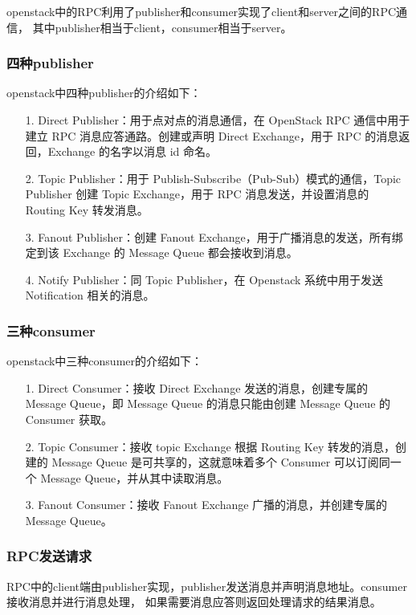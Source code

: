 \documentclass[a4paper,left=1.5cm,right=1.5cm,11pt]{article}
\begin{document}
	openstack中的RPC利用了publisher和consumer实现了client和server之间的RPC通信，
	其中publisher相当于client，consumer相当于server。\par

\subsubsection{四种publisher}
	openstack中四种publisher的介绍如下：
	\begin{itemize}
		\item[1.] Direct Publisher：用于点对点的消息通信，在 OpenStack RPC 通信中用于建立 RPC 消息应答通路。创建或声明 Direct Exchange，用于 RPC 的消息返回，Exchange 的名字以消息 id 命名。
		\item[2.] Topic Publisher：用于 Publish-Subscribe（Pub-Sub）模式的通信，Topic Publisher 创建 Topic Exchange，用于 RPC 消息发送，并设置消息的 Routing Key 转发消息。
		\item[3.] Fanout Publisher：创建 Fanout Exchange，用于广播消息的发送，所有绑定到该 Exchange 的 Message Queue 都会接收到消息。
		\item[4.] Notify Publisher：同 Topic Publisher，在 Openstack 系统中用于发送 Notification 相关的消息。
	\end{itemize}

\subsubsection{三种consumer}
	openstack中三种consumer的介绍如下：
	\begin{itemize}
		\item[1.] Direct Consumer：接收 Direct Exchange 发送的消息，创建专属的 Message Queue，即 Message Queue 的消息只能由创建 Message Queue 的 Consumer 获取。
		\item[2.] Topic Consumer：接收 topic Exchange 根据 Routing Key 转发的消息，创建的 Message Queue 是可共享的，这就意味着多个 Consumer 可以订阅同一个 Message Queue，并从其中读取消息。
		\item[3.] Fanout Consumer：接收 Fanout Exchange 广播的消息，并创建专属的 Message Queue。
	\end{itemize}

\subsubsection{RPC发送请求}
	RPC中的client端由publisher实现，publisher发送消息并声明消息地址。consumer接收消息并进行消息处理，
	如果需要消息应答则返回处理请求的结果消息。\par
\end{document}
